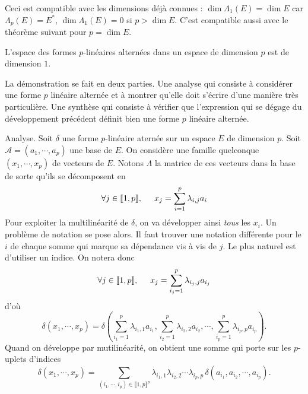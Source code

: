  Ceci est compatible avec les dimensions déjà connues : $\dim \Lambda_1(E) = \dim E$ car $\Lambda_p(E)= E^*$, $\dim \Lambda_1(E) =0$ si $p>\dim E$. C'est compatible aussi avec  le théorème suivant pour $p=\dim E$.
\begin{propn}
 L'espace des formes $p$-linéaires alternées dans un espace de dimension $p$ est de dimension $1$.
\end{propn}
\begin{demo}
 La démonstration se fait en deux parties. Une analyse qui consiste à considérer une forme $p$ linéaire alternée et à montrer qu'elle doit s'écrire d'une manière très particulière. Une synthèse qui consiste à vérifier que l'expression qui se dégage du développement précédent définit bien une forme $p$ linéaire alternée.
 
Analyse.\newline
Soit $\delta$ une forme $p$-linéaire aternée sur un espace $E$ de dimension $p$. Soit $\mathcal A=(a_1,\cdots,a_p)$ une base de $E$. On considère une famille quelconque $(x_1,\cdots,x_p)$ de vecteurs de $E$. Notons $\Lambda$ la matrice de ces vecteurs dans la base de sorte qu'ils se décomposent en
\begin{displaymath}
 \forall j\in \llbracket 1, p \rrbracket,\hspace{0,5cm}x_j =\sum_{i=1}^{p}\lambda_{i,j}a_i
\end{displaymath}
Pour exploiter la multilinéarité de $\delta$, on va développer ainsi \emph{tous} les $x_i$. Un problème de notation se pose alors. Il faut trouver une notation différente pour le $i$ de chaque somme qui marque sa dépendance vis à vis de $j$. Le plus naturel est d'utiliser un indice. On notera donc
\begin{displaymath}
 \forall j\in \llbracket 1, p \rrbracket,\hspace{0,5cm}x_j =\sum_{i_j=1}^{p}\lambda_{i_j,j}a_{i_j}
\end{displaymath}
d'où
\begin{displaymath}
\delta(x_1,\cdots,x_p)=
\delta\left( 
\sum_{i_1=1}^{p}\lambda_{i_1,1}a_{i_1}, \sum_{i_2=1}^{p}\lambda_{i_2,2}a_{i_2},
\cdots,
\sum_{i_p=1}^{p}\lambda_{i_p,p}a_{i_p}
\right) .
\end{displaymath}
Quand on développe par mutilinéarité, on obtient une somme qui porte sur les $p$-uplets d'indices
\begin{displaymath}
\delta(x_1,\cdots,x_p)=
\sum_{(i_1,\cdots,i_p)\in \llbracket 1,p \rrbracket^p}\lambda_{i_1,1}\lambda_{i_2,2}\cdots \lambda_{i_p,p} 
\,\delta\left(a_{i_1},a_{i_2},\cdots,a_{i_p} \right) .

\end{displaymath}
\end{demo}
